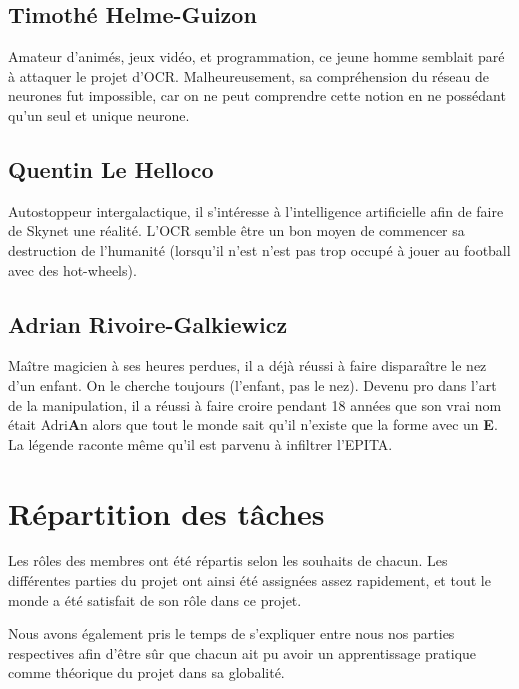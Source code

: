 \section{Timothé Helme-Guizon}

Amateur d'animés, jeux vidéo, et programmation, ce jeune homme semblait paré à
attaquer le projet d'OCR. Malheureusement, sa compréhension du réseau de
neurones fut impossible, car on ne peut comprendre cette notion en ne possédant
qu'un seul et unique neurone.

\newpage

\section{Quentin Le Helloco}

Autostoppeur intergalactique, il s'intéresse à l'intelligence artificielle afin
de faire de Skynet une réalité. L'OCR semble être un bon moyen de commencer sa
destruction de l'humanité (lorsqu'il n’est n'est pas trop occupé à jouer au
football avec des hot-wheels).

\section{Adrian Rivoire-Galkiewicz}

Maître magicien à ses heures perdues, il a déjà réussi à faire disparaître le
nez d’un enfant. On le cherche toujours (l'enfant, pas le nez). Devenu pro dans
l’art de la manipulation, il a réussi à faire croire pendant 18 années que son
vrai nom était Adri\textbf{A}n alors que tout le monde sait qu’il n’existe que
la forme avec un \textbf{E}.  La légende raconte même qu'il est parvenu à
infiltrer l'EPITA.

\chapter{Répartition des tâches}

Les rôles des membres ont été répartis selon les souhaits de chacun. Les
différentes parties du projet ont ainsi été assignées assez rapidement, et tout
le monde a été satisfait de son rôle dans ce projet.

Nous avons également pris le temps de s'expliquer entre nous nos parties
respectives afin d'être sûr que chacun ait pu avoir un apprentissage pratique
comme théorique du projet dans sa globalité.

\vspace{2em}

